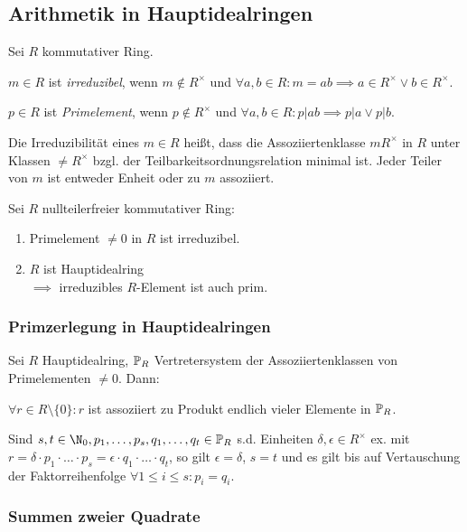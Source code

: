 \subsection*{Arithmetik in Hauptidealringen}

Sei $R$ kommutativer Ring.

$m \in R$ ist \emph{irreduzibel}, wenn $m \notin R^\times$ und $\forall a, b \in R: m = ab \implies a \in R^\times \lor b \in R^\times$.

$p \in R$ ist \emph{Primelement}, wenn $p \notin R^\times$ und $\forall a, b \in R: p | ab \implies p | a \lor p | b$.

\spacing

Die Irreduzibilität eines $m \in R$ heißt, dass die Assoziiertenklasse $mR^\times$ in $R$ unter Klassen $\neq R^\times$ bzgl. der Teilbarkeitsordnungsrelation minimal ist. Jeder Teiler von $m$ ist entweder Enheit oder zu $m$ assoziiert.

\spacing

Sei $R$ nullteilerfreier kommutativer Ring:

\begin{enumerate}[label=(\alph*)]
	\item Primelement $\neq 0$ in $R$ ist irreduzibel.
	\item $R$ ist Hauptidealring \\ $\implies $ irreduzibles $R$-Element ist auch prim.
\end{enumerate}

\subsubsection*{Primzerlegung in Hauptidealringen}

Sei $R$ Hauptidealring, $\mathbb{P}_R$ Vertretersystem der Assoziiertenklassen von Primelementen $\neq 0$. Dann:

\vspace*{1mm}

$\forall r \in R \setminus \{0\} : r$ ist assoziiert zu Produkt endlich vieler Elemente in $\mathbb{P}_R$.

Sind $s, t \in \N_0, p_1,\dots,p_s,q_1,\dots,q_t \in \Primes_R$ s.d. Einheiten $\delta, \epsilon \in R^\times$ ex. mit $r = \delta \cdot p_1 \cdot \dots \cdot p_s = \epsilon \cdot q_1 \cdot \dots \cdot q_t$, so gilt $\epsilon = \delta$, $s = t$ und es gilt bis auf Vertauschung der Faktorreihenfolge $\forall 1 \leq i \leq s : p_i = q_i$.

\subsubsection*{Summen zweier Quadrate}

